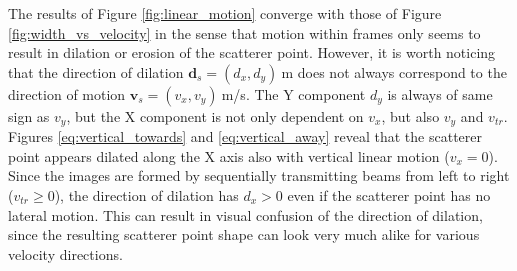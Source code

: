 The results of Figure \ref{fig:linear_motion} converge with those of Figure \ref{fig:width_vs_velocity} in the sense that motion within frames only seems to result in dilation or erosion of the scatterer point. However, it is worth noticing that the direction of dilation $\boldsymbol{d}_s = (d_x, d_y)~$m does not always correspond to the direction of motion $\boldsymbol{v}_s = (v_x, v_y)~$m/s. 
The Y component $d_y$ is always of same sign as $v_y$, but the X component is not only dependent on $v_x$, but also $v_y$ and $v_{tr}$.
Figures \ref{eq:vertical_towards} and \ref{eq:vertical_away} reveal that the scatterer point appears dilated along the X axis also with vertical linear motion ($v_x = 0$). 
Since the images are formed by sequentially transmitting beams from left to right ($v_{tr} \geq 0$), the direction of dilation has $d_x >0$ even if the scatterer point has no lateral motion. This can result in visual confusion of the direction of dilation, since the resulting scatterer point shape can look very much alike for various velocity directions.

